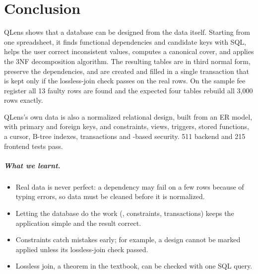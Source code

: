 \chapter{Conclusion}
\label{ch:conclusion}

QLens shows that a database can be designed from the data itself. Starting from one spreadsheet, it
finds functional dependencies and candidate keys with SQL, helps the user correct inconsistent values,
computes a canonical cover, and applies the 3NF decomposition algorithm. The resulting tables are in
third normal form, preserve the dependencies, and are created and filled in a single transaction that
is kept only if the lossless-join check passes on the real rows. On the sample fee register all 13
faulty rows are found and the expected four tables rebuild all 3{,}000 rows exactly.

QLens's own data is also a normalized relational design, built from an ER model, with primary and
foreign keys,  and  constraints, views, triggers, stored functions, a cursor,
B-tree indexes, transactions and -based security. 511 backend and 215 frontend tests pass.

\paragraph{What we learnt.}
\begin{itemize}
  \item Real data is never perfect: a dependency may fail on a few rows because of typing errors, so
  data must be cleaned before it is normalized.
  \item Letting the database do the work (, constraints, transactions) keeps the
  application simple and the result correct.
  \item Constraints catch mistakes early; for example, a design cannot be marked applied unless its
  lossless-join check passed.
  \item Lossless join, a theorem in the textbook, can be checked with one SQL query.
\end{itemize}

